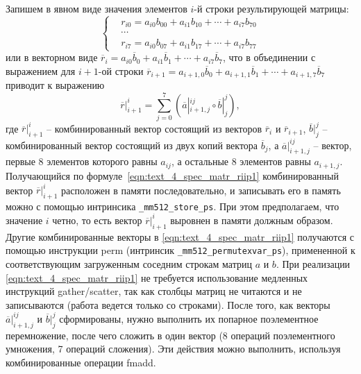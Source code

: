 Запишем в явном виде значения элементов $i$-й строки результирующей матрицы:
\begin{equation}
	\left\{
		\begin{aligned}
			& r_{i0} = a_{i0}b_{00} + a_{i1}b_{10} + \cdots + a_{i7}b_{70} \\
			& \cdots \\
			& r_{i7} = a_{i0}b_{07} + a_{i1}b_{17} + \cdots + a_{i7}b_{77}
		\end{aligned}
	\right.
\end{equation}
или в векторном виде $\overline{r}_i = a_{i0}\overline{b}_0 + a_{i1}\overline{b}_1 + \cdots + a_{i7}\overline{b}_7$, что в объединении с выражением для $i + 1$-ой строки $\overline{r}_{i + 1} = a_{i + 1,0}\overline{b}_0 + a_{i + 1,1}\overline{b}_1 + \cdots + a_{i + 1,7}\overline{b}_7$ приводит к выражению
\begin{equation}\label{eqn:text_4_spec_matr_riip1}
	\overline{r}|_{i + 1}^i
	=
	\sum_{j = 0}^{7} \left(  \overline{a}|_{i + 1,j}^{ij} \circ \overline{b}|_j^j \right),
\end{equation}
где $\overline{r}|_{i + 1}^i$ -- комбинированный вектор состоящий из векторов $\overline{r}_i$ и $\overline{r}_{i + 1}$, $\overline{b}|_j^j$ -- комбинированный вектор состоящий из двух копий вектора $\overline{b}_j$, а $\overline{a}|_{i + 1,j}^{ij}$ -- вектор, первые 8 элементов которого равны $a_{ij}$, а остальные 8 элементов равны $a_{i + 1,j}$.
Получающийся по формуле~\eqref{eqn:text_4_spec_matr_riip1} комбинированный вектор $\overline{r}|_{i + 1}^i$ расположен в памяти последовательно, и записывать его в память можно с помощью интринсика \texttt{\_mm512\_store\_ps}.
При этом предполагаем, что значение $i$ четно, то есть вектор $\overline{r}|_{i + 1}^i$ выровнен в памяти должным образом.
Другие комбинированные векторы в \eqref{eqn:text_4_spec_matr_riip1} получаются с помощью инструкции perm (интринсик \texttt{\_mm512\_permutexvar\_ps}), примененной к соответствующим загруженным соседним строкам матриц $a$ и $b$.
При реализации \eqref{eqn:text_4_spec_matr_riip1} не требуется использование медленных инструкций gather/scatter, так как столбцы матриц не читаются и не записываются (работа ведется только со строками).
После того, как векторы $\overline{a}|_{i + 1,j}^{ij}$ и $\overline{b}|_j^j$ сформированы, нужно выполнить их попарное поэлементное перемножение, после чего сложить в один вектор (8 операций поэлементного умножения, 7 операций сложения).
Эти действия можно выполнить, используя комбинированные операции fmadd.

